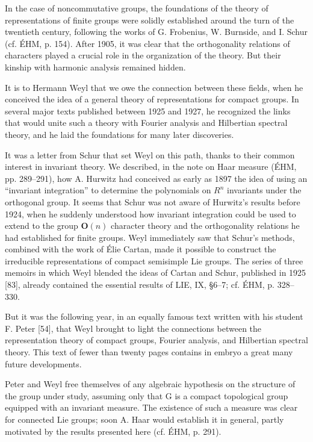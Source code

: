 In the case of noncommutative groups, the foundations of the theory of representations of finite groups were solidly established around the turn of the twentieth century, following the works of G. Frobenius, W. Burnside, and I. Schur (cf. ÉHM, p. 154). After 1905, it was clear that the orthogonality relations of characters played a crucial role in the organization of the theory. But their kinship with harmonic analysis remained hidden.

It is to Hermann Weyl that we owe the connection between these fields, when he conceived the idea of a general theory of representations for compact groups. In several major texts published between 1925 and 1927, he recognized the links that would unite such a theory with Fourier analysis and Hilbertian spectral theory, and he laid the foundations for many later discoveries.

It was a letter from Schur that set Weyl on this path, thanks to their common interest in invariant theory. We described, in the note on Haar measure (ÉHM, pp. 289–291), how A. Hurwitz had conceived as early as 1897 the idea of using an “invariant integration” to determine the polynomials on \(R^{n}\) invariants under the orthogonal group. It seems that Schur was not aware of Hurwitz's results before 1924, when he suddenly understood how invariant integration could be used to extend to the group \(\mathbf{O}(n)\) character theory and the orthogonality relations he had established for finite groups. Weyl immediately saw that Schur's methods, combined with the work of Élie Cartan, made it possible to construct the irreducible representations of compact semisimple Lie groups. The series of three memoirs in which Weyl blended the ideas of Cartan and Schur, published in 1925 {[}83{]}, already contained the essential results of LIE, IX, §6–7; cf. ÉHM, p. 328–330.

But it was the following year, in an equally famous text written with his student F. Peter {[}54{]}, that Weyl brought to light the connections between the representation theory of compact groups, Fourier analysis, and Hilbertian spectral theory. This text of fewer than twenty pages contains in embryo a great many future developments.

Peter and Weyl free themselves of any algebraic hypothesis on the structure of the group under study, assuming only that G is a compact topological group equipped with an invariant measure. The existence of such a measure was clear for connected Lie groups; soon A. Haar would establish it in general, partly motivated by the results presented here (cf. ÉHM, p. 291).

